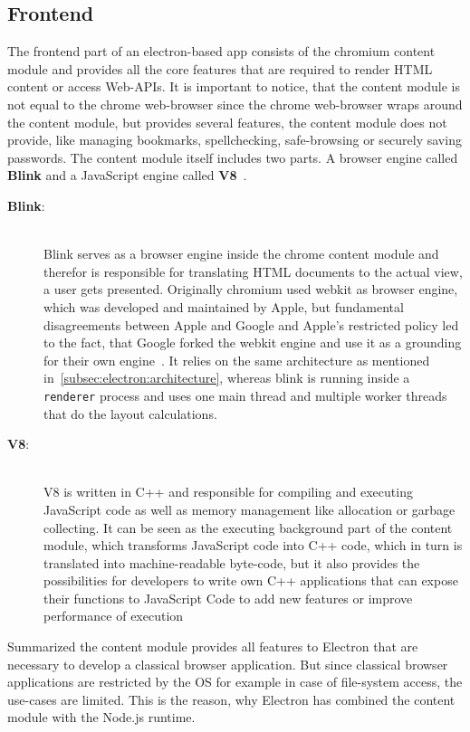 \subsection{Frontend}
\label{subsec:electron:frontend}
The frontend part of an electron-based app consists of the chromium content module and provides all the core features that are required to render \ac{HTML} content
or access Web-\ac{API}s.
It is important to notice, that the content module is not equal to the chrome web-browser since the chrome web-browser wraps around the content module, but provides
several features, the content module does not provide, like managing bookmarks, spellchecking, safe-browsing or securely saving passwords.
The content module itself includes two parts.
A browser engine called \textbf{Blink} and a JavaScript engine called \textbf{V8}~\cite{electron-in-action}.
\begin{description}
    \item[\textbf{Blink}:] \hfill \\ Blink serves as a browser engine inside the chrome content module and therefor is responsible for translating \ac{HTML} documents to the actual view, a user gets presented.
    Originally chromium used webkit as browser engine, which was developed and maintained by Apple, but fundamental disagreements between Apple and Google and Apple's restricted policy led to the fact,
    that Google forked the webkit engine and use it as a grounding for their own engine~\cite{heiseBlink}\cite{blinkGoogle}.
    It relies on the same architecture as mentioned in~\ref{subsec:electron:architecture}, whereas blink is running inside a \texttt{renderer} process and uses one main thread
    and multiple worker threads that do the layout calculations.
    \item [\textbf{V8}:] \hfill \\ V8 is written in C++ and responsible for compiling and executing JavaScript code as well as memory management like allocation or garbage collecting.
    It can be seen as the executing background part of the content module, which transforms JavaScript code into C++ code, which in turn is translated into machine-readable byte-code,
    but it also provides the possibilities for developers to write own C++ applications that can expose their functions to JavaScript Code to add new features or improve performance of execution~\cite{V8Doc}

\end{description}
Summarized the content module provides all features to Electron that are necessary to develop a classical browser application.
But since classical browser applications are restricted by the OS for example in case of file-system access, the use-cases are limited.
This is the reason, why Electron has combined the content module with the Node.js runtime.

